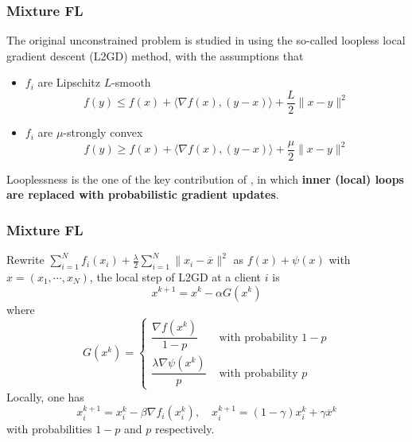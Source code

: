 
\begin{frame}
\frametitle{Mixture FL}

The original unconstrained problem is studied in \cite{hanzely2020federated} using the so-called {\color{red} loopless} local gradient descent (L2GD) method, with the assumptions that
\begin{itemize}
    \item $f_i$ are Lipschitz $L$-smooth
    $$f(y) \leqslant f(x) + \langle \nabla f(x), (y-x)\rangle + \dfrac{L}{2} \lVert x-y \rVert^2$$
    \item $f_i$ are $\mu$-strongly convex
    $$f(y) \geqslant f(x) + \langle \nabla f(x), (y-x)\rangle + \dfrac{\mu}{2} \lVert x-y \rVert^2$$
\end{itemize}

{\color{red} Looplessness} is the one of the key contribution of \cite{hanzely2020federated}, in which {\bfseries inner (local) loops are replaced with probabilistic gradient updates}.

\end{frame}


\begin{frame}
\frametitle{Mixture FL}

Rewrite $\sum\limits_{i=1}^N f_i(x_i) + \frac{\lambda}{2} \sum\limits_{i=1}^N \lVert x_i - \overline{x} \rVert^2$ as $f(x) + \psi(x)$ with $x = (x_1,\cdots,x_N)$, the local step of L2GD at a client $i$ is
$$x^{k+1} = x^k - \alpha G(x^k)$$
where
$$
G(x^k) = \begin{cases}
\dfrac{\nabla f(x^k)}{1-p} & \text{ with probability } 1-p \\
\dfrac{\lambda \nabla \psi(x^k)}{p} & \text{ with probability } p 
\end{cases}
$$
Locally, one has
$$x_i^{k+1} = x_i^k - \beta \nabla f_i(x_i^k), \quad x_i^{k+1} = (1-\gamma)x_i^k + \gamma \overline{x}^k$$
with probabilities $1-p$ and $p$ respectively.

\end{frame}


